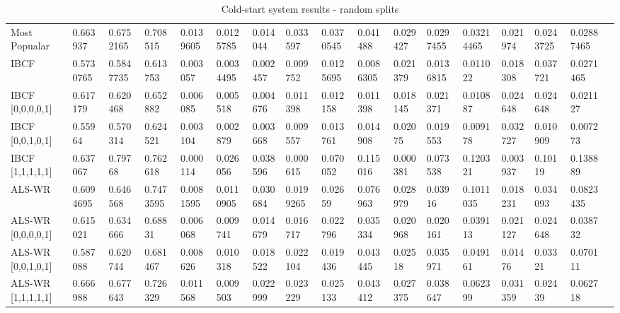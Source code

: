 \begin{table}[H]
{\begin{tabular}{*{17}{l}}
\rowcolor{Gray}
Most Popualar &	 0.663937	&	0.6752165	&	0.708515	&	0.0139605	&	0.0125785	&	0.014044	&	0.033597	&	0.0370545	&	0.041488	&	0.029427	&	0.0297455	&	0.03214465	&	0.021974	&	0.0243725	&	0.02887465 & \\
\rowcolor{Gray}
IBCF 		& 0.5730765	&	0.5847735	&	0.613753	&	0.003057	&	0.0034495	&	0.002457	&	0.009752	&	0.0125695	&	0.0086305	&	0.021379	&	0.0136815	&	0.011022	&	0.018308	&	0.037721	&	0.0271465 & \\																										
IBCF [0,0,0,0,1] &	0.617179	&	0.620468	&	0.652882	&	0.006085	&	0.005518	&	0.004676	&	0.011398	&	0.012158	&	0.011398	&	0.018145	&	0.021371	&	0.010887	&	0.024648	&	0.024648	&	0.021127	& \\
IBCF [0,0,1,0,1] &	0.55964	&	0.570314	&	0.624521	&	0.003104	&	0.002879	&	0.003668	&	0.009557	&	0.013761	&	0.014908	&	0.02075	&	0.019553	&	0.009178	&	0.032727	&	0.010909	&	0.007273 & \\
IBCF [1,1,1,1,1]	& 0.637067	&	0.79768	&	0.762618	&	0.000114	&	0.026056	&	0.038596	&	0.000615	&	0.070052	&	0.115016	&	0.000381	&	0.073538	&	0.120321	&	0.003937	&	0.10119	&	0.138889	& \\
\rowcolor{Gray}
ALS-WR & 	0.6094695	&	0.646568	&	0.7473595	&	0.0081595	&	0.0110905	&	0.030684	&	0.0199265	&	0.02659	&	0.076963	&	0.028979	&	0.03916	&	0.1011035	&	0.018231	&	0.034093	&	0.0823435	 & \\
ALS-WR [0,0,0,0,1] & 	0.615021	&	0.634666	&	0.68831	&	0.006068	&	0.009741	&	0.014679	&	0.016717	&	0.022796	&	0.035334	&	0.020968	&	0.020161	&	0.039113	&	0.021127	&	0.024648	&	0.038732	& \\
ALS-WR [0,0,1,0,1] & 	0.587088	&	0.620744	&	0.681467	&	0.008626	&	0.010318	&	0.018522	&	0.022104	&	0.019436	&	0.043445	&	0.02518	&	0.035971	&	0.049161	&	0.01476	&	0.03321	&	0.070111 & \\																																																							
ALS-WR [1,1,1,1,1] &	0.666988	&	0.677643	&	0.726329	&	0.011568	&	0.009503	&	0.022999	&	0.023229	&	0.025133	&	0.043412	&	0.027375	&	0.038647	&	0.062399	&	0.031359	&	0.02439	&	0.062718	& \\

\bottomrule
\end{tabular}
}
\caption{Cold-start system results - random splits}
\end{table}















